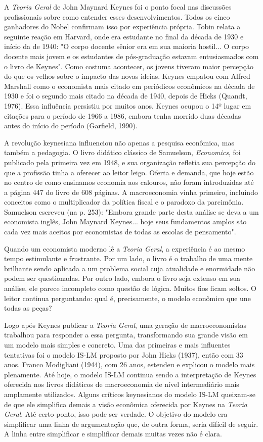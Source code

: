 \documentclass[12pt]{article}
\begin{document}
A \textit{Teoria Geral} de John Maynard Keynes foi o ponto focal nas discussões profissionais sobre como entender esses desenvolvimentos. Todos os cinco ganhadores do Nobel confirmam isso por experiência própria. Tobin relata a seguinte reação em Harvard, onde era estudante no final da década de 1930 e início da de 1940: "O corpo docente sênior era em sua maioria hostil... O corpo docente mais jovem e os estudantes de pós-graduação estavam entusiasmados com o livro de Keynes". Como costuma acontecer, os jovens tiveram maior percepção do que os velhos sobre o impacto das novas ideias. Keynes empatou com Alfred Marshall como o economista mais citado em periódicos econômicos na década de 1930 e foi o segundo mais citado na década de 1940, depois de Hicks (Quandt, 1976). Essa influência persistiu por muitos anos. Keynes ocupou o 14º lugar em citações para o período de 1966 a 1986, embora tenha morrido duas décadas antes do início do período (Garfield, 1990).

A revolução keynesiana influenciou não apenas a pesquisa econômica, mas também a pedagogia. O livro didático clássico de Samuelson, \textit{Economics}, foi publicado pela primeira vez em 1948, e sua organização refletia sua percepção do que a profissão tinha a oferecer ao leitor leigo. Oferta e demanda, que hoje estão no centro de como ensinamos economia aos calouros, não foram introduzidas até a página 447 do livro de 608 páginas. A macroeconomia vinha primeiro, incluindo conceitos como o multiplicador da política fiscal e o paradoxo da parcimônia. Samuelson escreveu (na p. 253): "Embora grande parte desta análise se deva a um economista inglês, John Maynard Keynes... hoje seus fundamentos amplos são cada vez mais aceitos por economistas de todas as escolas de pensamento".

Quando um economista moderno lê a \textit{Teoria Geral}, a experiência é ao mesmo tempo estimulante e frustrante. Por um lado, o livro é o trabalho de uma mente brilhante sendo aplicada a um problema social cuja atualidade e enormidade não podem ser questionadas. Por outro lado, embora o livro seja extenso em sua análise, ele parece incompleto como questão de lógica. Muitos fios ficam soltos. O leitor continua perguntando: qual é, precisamente, o modelo econômico que une todas as peças?

Logo após Keynes publicar a \textit{Teoria Geral}, uma geração de macroeconomistas trabalhou para responder a essa pergunta, transformando sua grande visão em um modelo mais simples e concreto. Uma das primeiras e mais influentes tentativas foi o modelo IS-LM proposto por John Hicks (1937), então com 33 anos. Franco Modigliani (1944), com 26 anos, estendeu e explicou o modelo mais plenamente. Até hoje, o modelo IS-LM continua sendo a interpretação de Keynes oferecida nos livros didáticos de macroeconomia de nível intermediário mais amplamente utilizados. Alguns críticos keynesianos do modelo IS-LM queixam-se de que ele simplifica demais a visão econômica oferecida por Keynes na \textit{Teoria Geral}. Até certo ponto, isso pode ser verdade. O objetivo do modelo era simplificar uma linha de argumentação que, de outra forma, seria difícil de seguir. A linha entre simplificar e simplificar demais muitas vezes não é clara.
\end{document}
